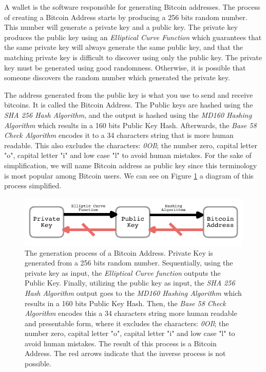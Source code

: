 \documentclass[../../thesis.tex]{subfiles}
\begin{document}
A wallet is the software responsible for generating Bitcoin addresses. The process of creating a Bitcoin Address starts by producing a 256 bits random number. This number will generate a private key and a public key. The private key produces the public key using an \textit{Elliptical Curve Function} which guarantees that the same private key will always generate the same public key, and that the matching private key is difficult to discover using only the public key. The private key must be generated using good randomness. Otherwise, it is possible that someone discovers the random number which generated the private key.

The address generated from the public key is what you use to send and receive bitcoins. It is called the Bitcoin Address. The Public keys are hashed using the \textit{SHA 256 Hash Algorithm}, and the output is hashed using the \textit{MD160 Hashing Algorithm} which results in a 160 bits Public Key Hash. Afterwards, the \textit{Base 58 Check Algorithm} encodes it to a 34 characters string that is more human readable. This also excludes the characters:  \textit{0OIl}; the number zero, capital letter "o", capital letter "i" and low case "l" to avoid human mistakes. For the sake of simplification, we will name Bitcoin address as public key since this terminology is most popular among Bitcoin users. We can see on Figure \ref{fig:key} a diagram of this process simplified.

\begin{figure}[H]
\centering

\includegraphics[width=\textwidth]{content/bitcoin/img/key}
\caption{The generation process of a Bitcoin Address. Private Key is generated from a 256 bits random number. Sequentially, using the private key as input, the \textit{Elliptical Curve function} outputs the Public Key. Finally, utilizing the public key as input, the \textit{SHA 256 Hash Algorithm}  output goes to the \textit{MD160 Hashing Algorithm} which results in a 160 bits Public Key Hash. Then, the \textit{Base 58 Check Algorithm} encodes this a 34 characters string more human readable and presentable form, where it excludes the characters:  \textit{0OIl}; the number zero, capital letter "o", capital letter "i" and low case "l" to avoid human mistakes. The result of this process is a Bitcoin Address. The red arrows indicate that the inverse process is not possible. }
\label{fig:key}
\end{figure}
\end{document}
